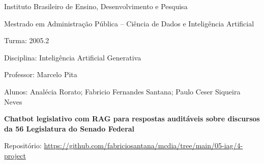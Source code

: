 \documentclass[11pt,a4paper]{article}
\begin{document}
\begin{center}
{\large Instituto Brasileiro de Ensino, Desenvolvimento e Pesquisa}\par
Mestrado em Administração Pública -- Ciência de Dados e Inteligência Artificial\par
Turma: 2005.2\par
Disciplina: Inteligência Artificial Generativa\par
Professor: Marcelo Pita\par
Alunos: Analécia Rorato; Fabricio Fernandes Santana; Paulo Ceser Siqueira Neves

\vspace{1.5em}
{\LARGE \textbf{Chatbot legislativo com RAG para respostas auditáveis sobre discursos da 56\textordfeminine{} Legislatura do Senado Federal}}\par

\vspace{0.75em}
Repositório: \url{https://github.com/fabriciosantana/mcdia/tree/main/05-iag/4-project}
\end{center}









% 
% 
% 
\end{document}
